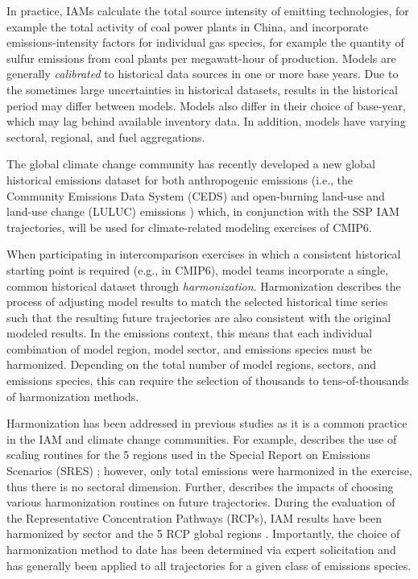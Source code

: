In practice, IAMs calculate the total source intensity of emitting technologies,
for example the total activity of coal power plants in China, and incorporate
emissions-intensity factors for individual gas species, for example the quantity
of sulfur emissions from coal plants per megawatt-hour of production. Models are generally \textit{calibrated} to historical data sources in one or more base years. Due to the sometimes large uncertainties
in historical datasets, results in the historical period may differ between
models. Models also differ in their choice of base-year, which may lag behind available inventory data. In addition, models have varying sectoral, regional, and fuel aggregations.

The
global climate change community has recently developed a new global historical
emissions dataset for both anthropogenic  emissions (i.e., the Community
Emissions Data System (CEDS) \cite{hoesly_historical_2017} and open-burning land-use and land-use change (LULUC)
emissions \cite{van_marle_historic_2017}) which, in
% 
% 
% 
%
conjunction with the SSP IAM trajectories, will be used for climate-related
modeling exercises of CMIP6.

When participating in intercomparison exercises in which a consistent historical starting point is required (e.g., in CMIP6), model teams incorporate a
single, common historical dataset through \textit{harmonization}. Harmonization describes the process of
adjusting model results to match the selected historical time series  such that the resulting future trajectories are also consistent with the
original modeled results. In the emissions context, this means that each
individual combination of model region, model sector, and emissions species must
be harmonized. Depending on the total number of model regions, sectors, and
emissions species, this can require the selection of thousands to
tens-of-thousands of harmonization methods.

Harmonization has been addressed in previous studies as it is a common practice
in the IAM and climate change communities. For example,
\cite{meinshausen_rcp_2011} describes the use of scaling routines for the 5
regions used in the Special Report on Emissions Scenarios (SRES)
\cite{nakicenovic2000}; however, only total emissions were harmonized in the
exercise, thus there is no sectoral dimension. Further,
\cite{rogelj_discrepancies_2011} describes the impacts of choosing various
harmonization routines on future trajectories. During the evaluation of the
Representative Concentration Pathways (RCPs), IAM results have been harmonized
by sector and the 5 RCP global regions
\cite{vuuren_representative_2011}. Importantly, the choice of harmonization
method to date has been determined via expert solicitation and has generally
been applied to all trajectories for a given class of emissions species.

